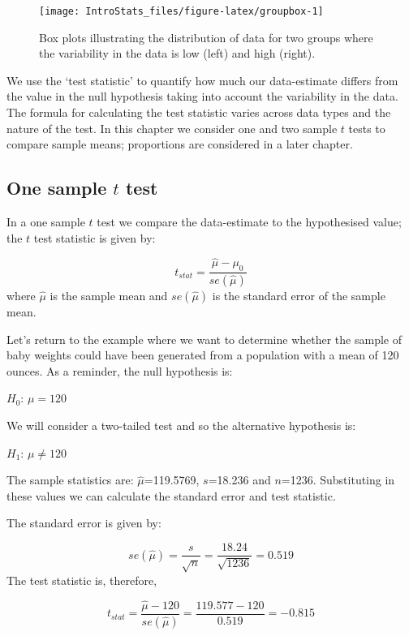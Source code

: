 \documentclass[
  oneside]{krantz}
\begin{document}
\begin{figure}

{\centering \texttt{[image: IntroStats\_files/figure-latex/groupbox-1]} 

}

\caption{Box plots illustrating the distribution of data for two groups where the variability in the data is low (left) and high (right).}\label{fig:groupbox}
\end{figure}

We use the `test statistic' to quantify how much our data-estimate differs from the value in the null hypothesis taking into account the variability in the data. The formula for calculating the test statistic varies across data types and the nature of the test. In this chapter we consider one and two sample \(t\) tests to compare sample means; proportions are considered in a later chapter.

\hypertarget{one-sample-t-test}{%
\subsection{\texorpdfstring{One sample \(t\) test}{One sample t test}}\label{one-sample-t-test}}

In a one sample \(t\) test we compare the data-estimate to the hypothesised value; the \(t\) test statistic is given by:

\[t_{stat}=\frac{\hat \mu - \mu_0}{se(\hat \mu)}\]
where \(\hat \mu\) is the sample mean and \(se(\hat \mu)\) is the standard error of the sample mean.

Let's return to the example where we want to determine whether the sample of baby weights could have been generated from a population with a mean of 120 ounces. As a reminder, the null hypothesis is:

\(H_0\): \({\mu} = 120\)

We will consider a two-tailed test and so the alternative hypothesis is:

\(H_1\): \({\mu} \neq 120\)

The sample statistics are: \(\hat\mu\)=119.5769, \(s\)=18.236 and \(n\)=1236. Substituting in these values we can calculate the standard error and test statistic.

The standard error is given by:

\[se(\hat\mu) = \frac{s}{\sqrt{n}} = \frac{18.24}{\sqrt{1236}} = 0.519\]
The test statistic is, therefore,

\[t_{stat}=\frac{\hat{\mu} - 120}{se(\hat{\mu})} = \frac{119.577 - 120}{0.519} = -0.815\]
\end{document}
